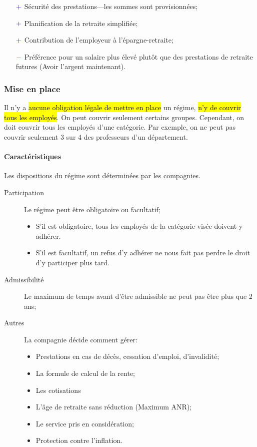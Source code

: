 \documentclass[10pt, french]{article}
\begin{document}
\begin{multicols*}{3}
\begin{description}
\begin{itemize}[leftmargin = *]
		\item[$\color{blue}+$]	Sécurité des prestations---les sommes sont provisionnées;
		\item[$\color{blue}+$]	Planification de la retraite simplifiée;
		\item[$\color{blue}+$]	Contribution de l'employeur à l'épargne-retraite;
		\item[$\color{red}-$]	Préférence pour un salaire plus élevé plutôt que des prestations de retraite  futures (Avoir l'argent maintenant).
		\end{itemize}
\end{description}

\subsubsection*{Mise en place}
Il n'y a \hl{aucune obligation légale de mettre en place} un régime, \hl{n'y de couvrir tous les employés}. On peut couvrir seulement certains groupes. Cependant, on doit couvrir tous les employés d'une catégorie. Par exemple, on ne peut pas couvrir seulement 3 sur 4 des professeurs d'un département.

\paragraph*{Caractéristiques}	Les dispositions du régime sont déterminées par les compagnies.
\begin{description}
	\item[Participation]	Le régime peut être obligatoire ou facultatif;
		\begin{itemize}[leftmargin = *]
		\item 	S'il est obligatoire, tous les employés de la catégorie visée doivent y adhérer.
		\item	S'il est facultatif, un refus d'y adhérer ne nous fait pas perdre le droit d'y participer plus tard.
		\end{itemize}
	\item[Admissibilité]	Le maximum de temps avant d'être admissible ne peut pas être plus que 2 ans;
	\item[Autres]	La compagnie décide comment gérer:
		\begin{itemize}[leftmargin = *]
		\item	Prestations en cas de décès, cessation d'emploi, d'invalidité;
		\item	La formule de calcul de la rente;
		\item	Les cotisations
		\item	L'âge de retraite sans réduction (Maximum ANR);
		\item	Le service pris en considération;
		\item	Protection contre l'inflation.
		\end{itemize}
\end{description}



\end{multicols*}
\end{document}
